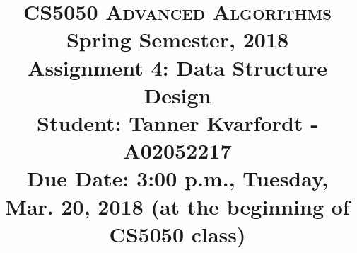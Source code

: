 \documentclass[11pt]{article}
\begin{document}
\baselineskip=14.0pt

\title{CS5050 \textsc{Advanced Algorithms}
\\{\large Spring Semester, 2018}
\\ Assignment 4: Data Structure Design
\\ {\large \textbf{Student:} Tanner Kvarfordt - A02052217}
\\ {\large {\bf Due Date: 3:00 p.m.}, Tuesday, Mar. 20, 2018 ({\bf at the beginning of CS5050 class})}}
\date{}


\maketitle

\vspace{-0.6in}
\end{document}
